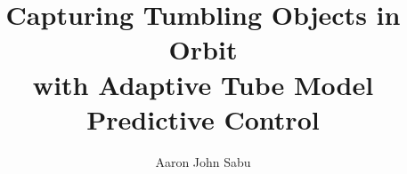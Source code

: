 
%
%



\title          {Capturing Tumbling Objects in Orbit \\
                 with Adaptive Tube Model Predictive Control}
                 
\author         {Aaron John Sabu}







%
%

%
%






